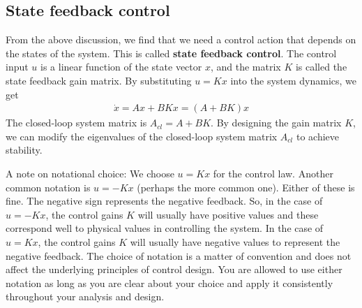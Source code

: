 \documentclass{ee122_notes}
\begin{document}
\subsection{State feedback control}
From the above discussion, we find that we need a control action that depends on the states of the system. This is called \textbf{state feedback control}. The control input $u$ is a linear function of the state vector $x$, and the matrix $K$ is called the state feedback gain matrix. By substituting $u = Kx$ into the system dynamics, we get
\begin{align*}
\dot{x} = Ax + BKx = (A + BK)x
\end{align*}
The closed-loop system matrix is $A_{cl} = A + BK$. By designing the gain matrix $K$, we can modify the eigenvalues of the closed-loop system matrix $A_{cl}$ to achieve stability. 

\begin{remark}
    A note on notational choice: We choose $u = Kx$ for the control law. Another common notation is $u = -Kx$ (perhaps the more common one). Either of these is fine. The negative sign represents the negative feedback. So, in the case of $u = -Kx$, the control gains $K$ will usually have positive values and these correspond well to physical values in controlling the system. In the case of $u = Kx$, the control gains $K$ will usually have negative values to represent the negative feedback. The choice of notation is a matter of convention and does not affect the underlying principles of control design. You are allowed to use either notation as long as you are clear about your choice and apply it consistently throughout your analysis and design.
\end{remark}
\end{document}
